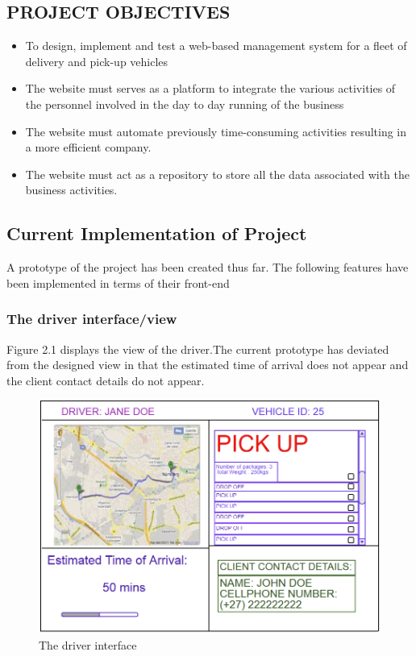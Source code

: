 \documentclass[paper=a4, fontsize=11pt]{scrartcl} %
\numberwithin{equation}{section} %
\numberwithin{figure}{section} %
\numberwithin{table}{section} %
\begin{document}
%
\subsection{PROJECT OBJECTIVES}

\begin{itemize}
\item To design, implement and test a web-based management system for a fleet of delivery and pick-up vehicles
\item The website must serves as a platform to integrate the various activities of the personnel involved in the day to day running of the business
\item The website must automate previously time-consuming activities resulting in a  more efficient company.
\item The website must act as a repository  to store all the data associated with the business activities.
\end{itemize}

\subsection{Current Implementation of Project}

A prototype of the project has been created thus far. The following features have been implemented in terms of their front-end



\subsubsection{The driver interface/view}
 Figure 2.1 displays the view of the driver.The current prototype has deviated from the designed view in that the estimated time of arrival does not appear and the client contact details do not appear.
\begin{figure}[hbt!]
\centering
\includegraphics[width=5in]{driver.png}
\caption{The driver interface}
\label{Driver}
\end{figure}
\end{document}
